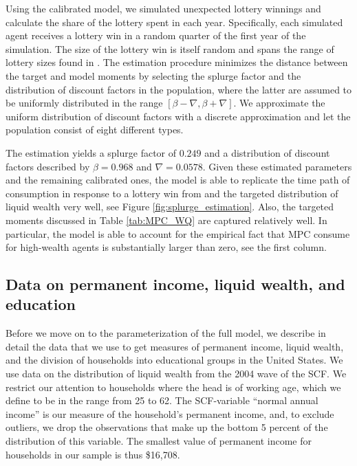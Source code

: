 \documentclass[\econtexRoot/HAFiscal]{subfiles}
\begin{document}
Using the calibrated model, we simulated unexpected lottery winnings and calculate the share of the lottery spent in each year. Specifically, each simulated agent receives a lottery win in a random quarter of the first year of the simulation. The size of the lottery win is itself random and spans the range of lottery sizes found in \citet{fagereng_mpc_2021}. The estimation procedure minimizes the distance between the target and model moments by selecting the splurge factor and the distribution of discount factors in the population, where the latter are assumed to be uniformly distributed in the range $[\beta-\nabla, \beta+\nabla]$. We approximate the uniform distribution of discount factors with a discrete approximation and let the population consist of eight different types.

The estimation yields a splurge factor of $0.249$ and a distribution of discount factors described by $\beta = 0.968$ and $\nabla=0.0578$. Given these estimated parameters and the remaining calibrated ones, the model is able to replicate the time path of consumption in response to a lottery win from \citet{fagereng_mpc_2021} and the targeted distribution of liquid wealth very well, see Figure \ref{fig:splurge_estimation}. Also, the targeted moments discussed in Table \ref{tab:MPC_WQ} are captured relatively well. In particular, the model is able to account for the empirical fact that MPC consume for high-wealth agents is substantially larger than zero, see the first column. 



 

\hypertarget{data-on-permanent-income-liquid-wealth-and-education}{}\par\subsection{Data on permanent income, liquid wealth, and education}
\notinsubfile{\label{sec:SCFdata}}

Before we move on to the parameterization of the full model, we describe in detail the data that we use to get measures of permanent income, liquid wealth, and the division of households into educational groups in the United States. We use data on the distribution of liquid wealth from the 2004 wave of the SCF. We restrict our attention to households where the head is of working age, which we define to be in the range from 25 to 62. The SCF-variable ``normal annual income'' is our measure of the household's permanent income, and, to exclude outliers, we drop the observations that make up the bottom 5 percent of the distribution of this variable. The smallest value of permanent income for households in our sample is thus \$16,708. 
\end{document}

